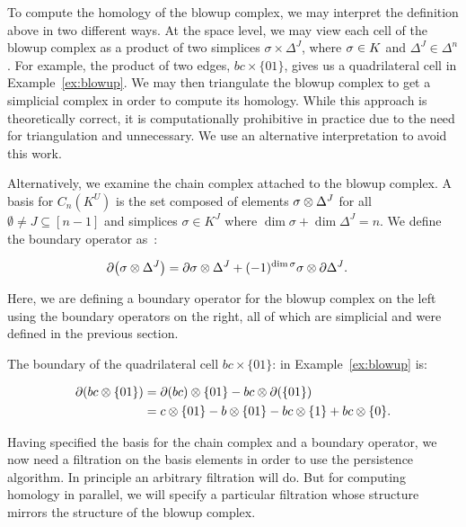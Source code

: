 To compute the homology of the blowup complex, we may interpret the definition 
above in two different ways.  
At the space level, we may view each cell of the blowup complex as a product 
of two simplices $\sigma \times \Delta^J$, where 
$\sigma \in K$ and $\Delta^J \in \Delta^n$.  
For example, the product of two edges, $bc \times \{01\}$, gives us a 
quadrilateral cell in Example~\ref{ex:blowup}.  
We may then triangulate the blowup complex to get a simplicial complex in order 
to compute its homology.  While this approach is theoretically correct, it is 
computationally prohibitive in practice due to the need for triangulation and 
unnecessary. We use an alternative interpretation to avoid this work.

Alternatively, we examine the chain complex attached to the blowup complex.
A basis for $C_n(K^U)$ is the set composed of elements 
$\sigma \otimes \Delta^J$ for all $\emptyset \not = J \subseteq [n-1]$ and 
simplices $\sigma \in K^J$ where $\dim{\sigma} + \dim{\Delta^J} = n$.  
We define the boundary operator as~\cite[\textrm{Lemma }4]{zc-lh-08}:

\begin{align*}
\partial{\left (\sigma \otimes\Delta^J \right)}
&=
\partial{\sigma} \otimes \Delta^J + 
(-1)^{\dim{\sigma}}\sigma \otimes \partial\Delta^J.
\end{align*}

Here, we are defining a boundary operator for the blowup complex on the left 
using the boundary operators on the right, all of which are simplicial and were 
defined in the previous section. 
\begin{example}
The boundary of the quadrilateral cell 
$bc \times \{01\}$: in Example~\ref{ex:blowup} is:

\begin{align*}
\partial{\left (bc \otimes\{01\} \right)}
&=
\partial{(bc)} \otimes \{01\} - bc \otimes \partial(\{01\}) \\
&= c \otimes \{01\} - b \otimes \{01\} - bc \otimes \{1\} + bc \otimes \{0\}.
\end{align*}

\end{example}
Having specified the basis for the chain complex and a boundary operator, 
we now need a filtration on the basis elements in order to use the 
persistence algorithm. In principle an arbitrary filtration will do.
But for computing homology in parallel, we will specify a particular filtration 
whose structure mirrors the structure of the blowup complex. 

